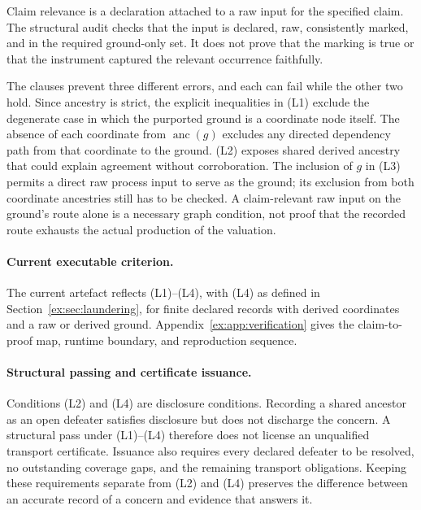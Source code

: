 \documentclass[smallextended,envcountsect,envcountsame,natbib]{svjour3}
\begin{document}
Claim relevance is a declaration attached to a raw input for the specified claim. The structural audit checks that the input is declared, raw, consistently marked, and in the required ground-only set. It does not prove that the marking is true or that the instrument captured the relevant occurrence faithfully.

The clauses prevent three different errors, and each can fail while the other two hold. Since ancestry is strict, the explicit inequalities in (L1) exclude the degenerate case in which the purported ground is a coordinate node itself. The absence of each coordinate from $\operatorname{anc}(g)$ excludes any directed dependency path from that coordinate to the ground. (L2) exposes shared derived ancestry that could explain agreement without corroboration. The inclusion of $g$ in (L3) permits a direct raw process input to serve as the ground; its exclusion from both coordinate ancestries still has to be checked. A claim-relevant raw input on the ground's route alone is a necessary graph condition, not proof that the recorded route exhausts the actual production of the valuation.

\paragraph{Current executable criterion.} The current artefact reflects (L1)--(L4), with (L4) as defined in Section~\ref{ex:sec:laundering}, for finite declared records with derived coordinates and a raw or derived ground. Appendix~\ref{ex:app:verification} gives the claim-to-proof map, runtime boundary, and reproduction sequence.

\paragraph{Structural passing and certificate issuance.}
Conditions (L2) and (L4) are disclosure conditions. Recording a shared ancestor as an open defeater satisfies disclosure but does not discharge the concern. A structural pass under (L1)--(L4) therefore does not license an unqualified transport certificate. Issuance also requires every declared defeater to be resolved, no outstanding coverage gaps, and the remaining transport obligations. Keeping these requirements separate from (L2) and (L4) preserves the difference between an accurate record of a concern and evidence that answers it.
\end{document}
